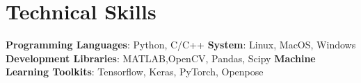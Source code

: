 \section{Technical Skills}
\PubItemStart
     \pubitem \textbf{Programming Languages}: Python, C/C++ 
     \pubitem \textbf{System}: Linux, MacOS, Windows
     \pubitem \textbf{Development Libraries}: MATLAB,OpenCV, Pandas, Scipy
     \pubitem \textbf{Machine Learning Toolkits}: Tensorflow, Keras, PyTorch, Openpose
\PubItemEnd